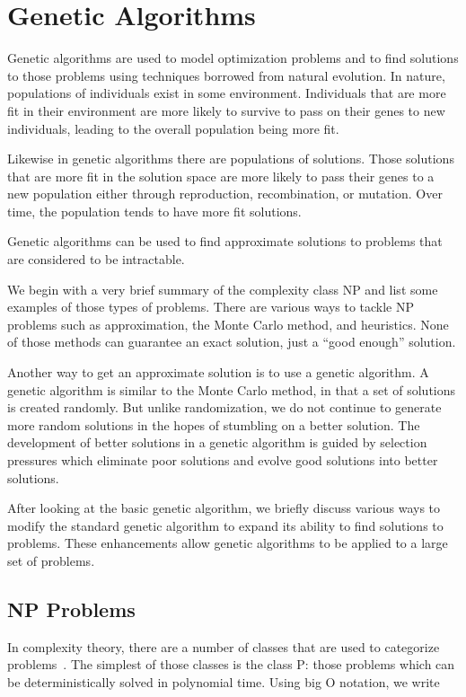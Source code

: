 \clearpage
\chapter{Genetic Algorithms}\label{chap:geneticAlgorithms}

Genetic algorithms are used to model optimization problems and to find solutions
to those problems using techniques borrowed from natural evolution. In nature,
populations of individuals exist in some environment. Individuals that are more
fit in their environment are more likely to survive to pass on their genes to
new individuals, leading to the overall population being more fit.

Likewise in genetic algorithms there are populations of solutions. Those
solutions that are more fit in the solution space are more likely to pass their
genes to a new population either through reproduction, recombination, or
mutation. Over time, the population tends to have more fit solutions.

Genetic algorithms can be used to find approximate solutions to problems that
are considered to be intractable.

We begin with a very brief summary of the complexity class NP and list
some examples of those types of problems. There are various ways to tackle
NP problems such as approximation, the Monte Carlo method, and heuristics. None
of those methods can guarantee an exact solution, just a ``good enough''
solution.

Another way to get an approximate solution is to use a genetic algorithm. A
genetic algorithm is similar to the Monte Carlo method, in that a set of
solutions is created randomly. But unlike randomization, we do not continue to
generate more random solutions in the hopes of stumbling on a better solution.
The development of better solutions in a genetic algorithm is guided by
selection pressures which eliminate poor solutions and evolve good solutions
into better solutions.

After looking at the basic genetic algorithm, we briefly discuss various ways to
modify the standard genetic algorithm to expand its ability to find solutions to
problems. These enhancements allow genetic algorithms to be applied to a large
set of problems.

\section{NP Problems}

In complexity theory, there are a number of classes that are used to categorize
problems~\cite{alsuwaiyel1999algorithms,Cormen:2009:IAT:1614191}. The simplest
of those classes is the class P: those problems which can be deterministically
solved in polynomial time. Using big O notation, we write

